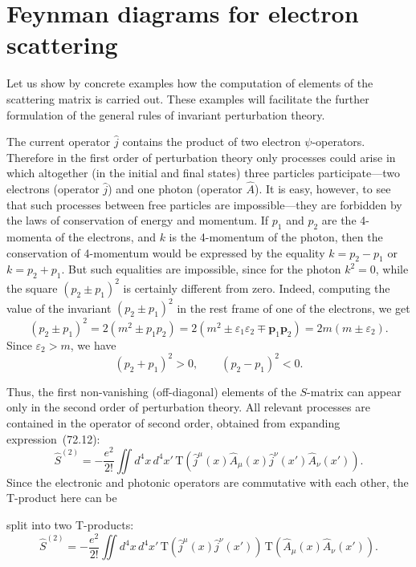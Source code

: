 \section{Feynman diagrams for electron scattering}

Let us show by concrete examples how the computation of elements of the scattering matrix is carried out. These examples will facilitate the further formulation of the general rules of invariant perturbation theory.

The current operator $\hat{j}$ contains the product of two electron $\psi$-operators. Therefore in the first order of perturbation theory only processes could arise in which altogether (in the initial and final states) three particles participate---two electrons (operator $\hat{j}$) and one photon (operator $\hat{A}$). It is easy, however, to see that such processes between free particles are impossible---they are forbidden by the laws of conservation of energy and momentum. If $p_1$ and $p_2$ are the 4-momenta of the electrons, and $k$ is the 4-momentum of the photon, then the conservation of 4-momentum would be expressed by the equality $k = p_2 - p_1$ or $k = p_2 + p_1$. But such equalities are impossible, since for the photon $k^2 = 0$, while the square $(p_2 \pm p_1)^2$ is certainly different from zero. Indeed, computing the value of the invariant $(p_2 \pm p_1)^2$ in the rest frame of one of the electrons, we get
\begin{equation}
(p_2 \pm p_1)^2 = 2(m^2 \pm p_1 p_2) = 2(m^2 \pm \varepsilon_1\varepsilon_2 \mp \mathbf{p}_1\mathbf{p}_2) = 2m(m \pm \varepsilon_2).
\tag{73.1}
\end{equation}
Since $\varepsilon_2 > m$, we have
\[
(p_2 + p_1)^2 > 0,\qquad (p_2 - p_1)^2 < 0.
\]

Thus, the first non-vanishing (off-diagonal) elements of the $S$-matrix can appear only in the second order of perturbation theory. All relevant processes are contained in the operator of second order, obtained from expanding expression~(72.12):
\[
\hat{S}^{(2)} = -\frac{e^2}{2!}\iint d^4x\,d^4x'\,\mathrm{T}(\hat{j}^\mu(x)\hat{A}_\mu(x)\hat{j}^\nu(x')\hat{A}_\nu(x')).
\]
Since the electronic and photonic operators are commutative with each other, the T-product here can be

split into two T-products:
\begin{equation}
\hat{S}^{(2)} = -\frac{e^2}{2!}\iint d^4x\,d^4x'\,\mathrm{T}(\hat{j}^\mu(x)\hat{j}^\nu(x'))\,\mathrm{T}(\hat{A}_\mu(x)\hat{A}_\nu(x')).
\tag{73.2}
\end{equation}

